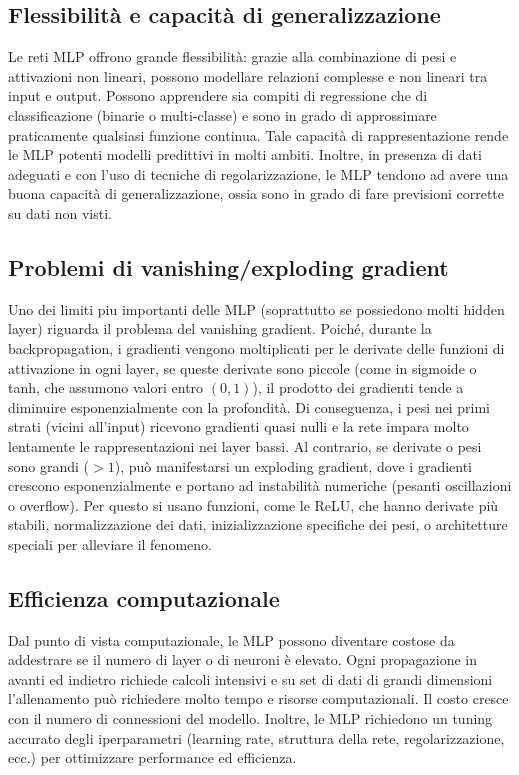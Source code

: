 \documentclass[a4paper,12pt]{report}
\begin{document}
	\subsection{Flessibilità e capacità di generalizzazione}
	Le reti MLP offrono grande flessibilità: grazie alla combinazione di pesi e attivazioni non lineari, possono modellare relazioni complesse e non lineari tra input e output. Possono apprendere sia compiti di regressione che di classificazione (binarie o multi-classe) e sono in grado di approssimare praticamente qualsiasi funzione continua. Tale capacità di rappresentazione rende le MLP potenti modelli predittivi in molti ambiti. Inoltre, in presenza di dati adeguati e con l'uso di tecniche di regolarizzazione, le MLP tendono ad avere una buona capacità di generalizzazione, ossia sono in grado di fare previsioni corrette su dati non visti.
	
	\subsection{Problemi di vanishing/exploding gradient}
	Uno dei limiti piu importanti delle MLP (soprattutto se possiedono molti hidden layer) riguarda il problema del vanishing gradient. Poiché, durante la backpropagation, i gradienti vengono moltiplicati per le derivate delle funzioni di attivazione in ogni layer, se queste derivate sono piccole (come in sigmoide o tanh, che assumono valori entro $(0,1)$), il prodotto dei gradienti tende a diminuire esponenzialmente con la profondità. Di conseguenza, i pesi nei primi strati (vicini all'input) ricevono gradienti quasi nulli e la rete impara molto lentamente le rappresentazioni nei layer bassi.
	Al contrario, se derivate o pesi sono grandi ($>1$), può manifestarsi un exploding gradient, dove i gradienti crescono esponenzialmente e portano ad instabilità numeriche (pesanti oscillazioni o overflow).
	Per questo si usano funzioni, come le ReLU, che hanno derivate più stabili, normalizzazione dei dati, inizializzazione specifiche dei pesi, o architetture speciali per alleviare il fenomeno.
	
	\subsection{Efficienza computazionale}
	Dal punto di vista computazionale, le MLP possono diventare costose da addestrare se il numero di layer o di neuroni è elevato. Ogni propagazione in avanti ed indietro richiede calcoli intensivi e su set di dati di grandi dimensioni l'allenamento può richiedere molto tempo e risorse computazionali. Il costo cresce con il numero di connessioni del modello. Inoltre, le MLP richiedono un tuning accurato degli iperparametri (learning rate, struttura della rete, regolarizzazione, ecc.) per ottimizzare performance ed efficienza.
	
\end{document}
